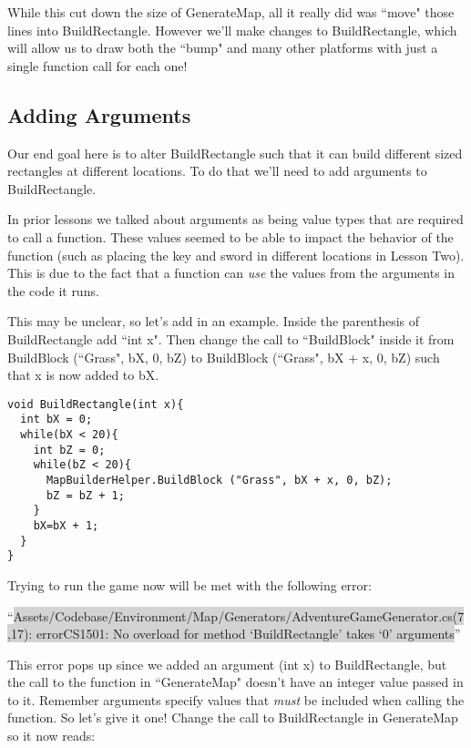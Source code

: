 \documentclass{article}
\begin{document}
While this cut down the size of GenerateMap, all it really did was ``move" those lines into BuildRectangle. However we'll make changes to BuildRectangle, which will allow us to draw both the ``bump" and many other platforms with just a single function call for each one!

\subsection{Adding Arguments}

Our end goal here is to alter BuildRectangle such that it can build different sized rectangles at different locations. To do that we'll need to add arguments to BuildRectangle.

In prior lessons we talked about arguments as being value types that are required to call a function. These values seemed to be able to impact the behavior of the function (such as placing the key and sword in different locations in Lesson Two). This is due to the fact that a function can \textit{use} the values from the arguments in the code it runs.

This may be unclear, so let's add in an example. Inside the parenthesis of BuildRectangle add ``int x". Then change the call to ``BuildBlock" inside it from BuildBlock (``Grass", bX, 0, bZ) to BuildBlock (``Grass", bX + x, 0, bZ) such that x is now added to bX.

\lstset{style=sharpc}
\begin{lstlisting}
void BuildRectangle(int x){
  int bX = 0;
  while(bX < 20){
    int bZ = 0;
    while(bZ < 20){
      MapBuilderHelper.BuildBlock ("Grass", bX + x, 0, bZ);
      bZ = bZ + 1;
    }
    bX=bX + 1;
  }
}
\end{lstlisting} 

Trying to run the game now will be met with the following error: 

``\colorbox{lightGray}{\color{Maroon}Assets/Codebase/Environment/Map/Generators/AdventureGameGenerator.cs(7,17): error}\newline \colorbox{lightGray}{\color{Maroon}CS1501: No overload for method `BuildRectangle' takes `0' arguments}''

This error pops up since we added an argument (int x) to BuildRectangle, but the call to the function in ``GenerateMap" doesn't have an integer value passed in to it. Remember arguments specify values that \textit{must} be included when calling the function. So let's give it one! Change the call to BuildRectangle in GenerateMap so it now reads:
\end{document}
